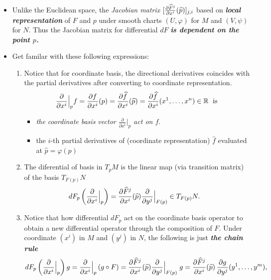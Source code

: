 \documentclass[11pt]{article}
\begin{document}
\begin{itemize}
\item \begin{remark}
Unlike the Euclidean space, the \emph{Jacobian matrix} $[\frac{\partial \widehat{F}^{j}}{ \partial x^{i}}(\widehat{p})]_{j,i}$ based on \emph{\textbf{local representation}} of $F$ and $p$ under smooth charts $(U,\varphi)$ for $M$ and $(V, \psi)$ for $N$. Thus the Jacobian matrix for differential $dF$  \emph{\textbf{is dependent on the point $p$.}}
\end{remark}


\item \begin{remark}
Get familar with these following expressions:
\begin{enumerate}
\item Notice that for coordinate basis, the directional derivatives coincides with the partial derivatives after converting to coordinate representation.
\begin{align*}
\dfrac{\partial}{\partial x^{i}}\Bigr|_p  f =  \dfrac{\partial f}{\partial x^{i}}(p) =  \dfrac{\partial \widehat{f}}{\partial x^{i}}(\widehat{p}) =\dfrac{\partial \widehat{f}}{\partial x^{i}}(x^1, \ldots, x^n)  \in {\mathbb R} \; \text{ is }
\end{align*}
\begin{itemize}
\item \emph{the coordinate basis vector $\frac{\partial}{\partial x^{i}}\bigr|_p$ act on $f$}.
\item the $i$-th partial derivatives of (coordinate representation) $\widehat{f}$ evaluated at $\widehat{p} =\varphi(p)$
\end{itemize}


\item  The diferential of basis in $T_pM$ is the linear map (via transition matrix) of the basis $T_{F(p)}N$  
\begin{align*}
dF_p\left(\dfrac{\partial}{\partial x^{i}}\Bigr|_p\right) &=  \dfrac{\partial \widehat{F}^{j}}{\partial x^{i}}(\widehat{p}) \dfrac{\partial}{\partial y^{j}}\Bigr|_{F(p)} \in T_{F(p)}N.
\end{align*}

\item Notice that how differential $dF_p$ act on the coordinate basis operator to obtain a new differential operator through the composition of $F$.  Under coordinate $(x^i)$ in $M$ and $(y^j)$ in $N$, the following is just \emph{\textbf{the chain rule}}
\begin{align*}
dF_p\left(\dfrac{\partial}{\partial x^{i}}\Bigr|_p\right)g =  \dfrac{\partial}{\partial x^{i}}\Bigr|_p\left(g \circ F\right) =  \dfrac{\partial \widehat{F}^{j}}{\partial x^{i}}(\widehat{p}) \dfrac{\partial}{\partial y^{j}}\Bigr|_{F(p)}\; g = \dfrac{\partial \widehat{F}^{j}}{\partial x^{i}}(\widehat{p})\, \dfrac{\partial g}{\partial y^{j}}(y^1, \ldots, y^{m}),
\end{align*}
\end{enumerate}
\end{remark}
\end{itemize}
\end{document}
